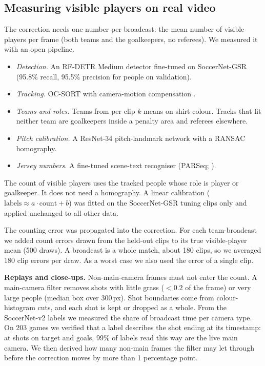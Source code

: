 \documentclass[11pt]{article}
\begin{document}
\subsection{Measuring visible players on real video}
The correction needs one number per broadcast: the mean number of visible players per frame (both teams and the
goalkeepers, no referees). We measured it with an open pipeline.
\begin{itemize}
\item \emph{Detection.} An RF-DETR Medium detector \citep{rfdetr} fine-tuned on SoccerNet-GSR (95.8\% recall, 95.5\%
precision for people on validation).
\item \emph{Tracking.} OC-SORT \citep{cao2023ocsort} with camera-motion compensation \citep{trackers}.
\item \emph{Teams and roles.} Teams from per-clip $k$-means on shirt colour. Tracks that fit neither team are
goalkeepers inside a penalty area and referees elsewhere.
\item \emph{Pitch calibration.} A ResNet-34 \citep{he2016resnet} pitch-landmark network with a RANSAC homography.
\item \emph{Jersey numbers.} A fine-tuned scene-text recogniser (PARSeq; \citealp{bautista2022parseq}).
\end{itemize}
The count of visible players uses the tracked people whose role is player or goalkeeper. It does not need a
homography. A linear calibration ($\text{labels} \approx a\cdot\text{count} + b$) was fitted on the SoccerNet-GSR
tuning clips only and applied unchanged to all other data.

The counting error was propagated into the correction. For each team-broadcast we added count errors drawn from the
held-out clips to its true visible-player mean (500 draws). A broadcast is a whole match, about 180 clips, so we
averaged 180 clip errors per draw. As a worst case we also used the error of a single clip.

\textbf{Replays and close-ups.} Non-main-camera frames must not enter the count. A main-camera filter removes shots
with little grass ($<0.2$ of the frame) or very large people (median box over 300\,px). Shot boundaries come from
colour-histogram cuts, and each shot is kept or dropped as a whole. From the SoccerNet-v2 labels we measured the
share of broadcast time per camera type. On 203 games we verified that a label describes the shot ending at its
timestamp: at shots on target and goals, 99\% of labels read this way are the live main camera. We then derived how
many non-main frames the filter may let through before the correction moves by more than 1 percentage point.
\end{document}
